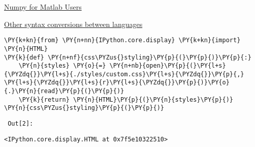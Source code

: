     \href{http://wiki.scipy.org/NumPy_for_Matlab_Users}{Numpy for Matlab
Users}

\href{http://mathesaurus.sourceforge.net/}{Other syntax conversions
between languages}


{\par%
\vspace{-1\baselineskip}%
}%
\begin{notebookcell}[2]%
\begin{addmargin}[\cellleftmargin]{0em}%
{\smaller%
\par%
%
\vspace{-1\smallerfontscale}%
\begin{Verbatim}[commandchars=\\\{\}]
\PY{k+kn}{from} \PY{n+nn}{IPython.core.display} \PY{k+kn}{import} \PY{n}{HTML}
\PY{k}{def} \PY{n+nf}{css\PYZus{}styling}\PY{p}{(}\PY{p}{)}\PY{p}{:}
    \PY{n}{styles} \PY{o}{=} \PY{n+nb}{open}\PY{p}{(}\PY{l+s}{\PYZdq{}}\PY{l+s}{./styles/custom.css}\PY{l+s}{\PYZdq{}}\PY{p}{,} \PY{l+s}{\PYZdq{}}\PY{l+s}{r}\PY{l+s}{\PYZdq{}}\PY{p}{)}\PY{o}{.}\PY{n}{read}\PY{p}{(}\PY{p}{)}
    \PY{k}{return} \PY{n}{HTML}\PY{p}{(}\PY{n}{styles}\PY{p}{)}
\PY{n}{css\PYZus{}styling}\PY{p}{(}\PY{p}{)}
\end{Verbatim}
%
\par%
\vspace{-1\smallerfontscale}}%
\end{addmargin}
\end{notebookcell}

\par\vspace{1\smallerfontscale}%
    
        {\par%
        \vspace{-1\smallerfontscale}%
        \noindent%
        \begin{minipage}{\cellleftmargin}%
    \hfill%
    {\smaller%
    \tt%
    \color{nbframe-out-prompt}%
    Out[2]:}%
    \hspace{\inputpadding}%
    \hspace{0em}%
    \hspace{3pt}%
    \end{minipage}%
        }%
    \begin{addmargin}[\cellleftmargin]{0em}%
    {\smaller%
    \vspace{-1\smallerfontscale}%
    
    
    
    \begin{verbatim}
<IPython.core.display.HTML at 0x7f5e10322510>
    \end{verbatim}

    
}%
    \end{addmargin}%

